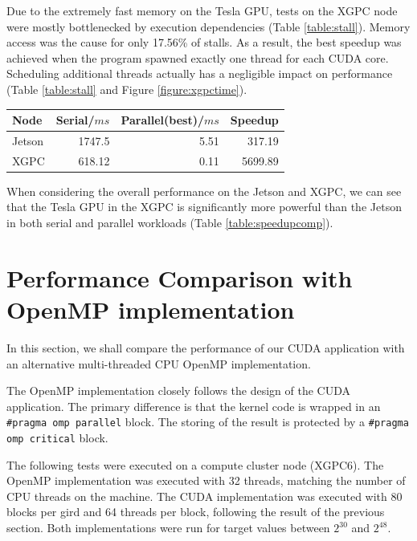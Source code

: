 \documentclass[a4paper,12pt]{article}
\begin{document}
Due to the extremely fast memory on the Tesla GPU, tests on the XGPC node were mostly bottlenecked by execution dependencies (Table \ref{table:stall}). Memory access was the cause for only 17.56\% of stalls. As a result, the best speedup was achieved when the program spawned exactly one thread for each CUDA core. Scheduling additional threads actually has a negligible impact on performance (Table \ref{table:stall} and Figure \ref{figure:xgpctime}).

\begin{center}
  \begin{tabular}{l | r r r}
    Node & Serial/$ms$ & Parallel(best)/$ms$ &	Speedup \\ \hline
    Jetson & 1747.5 & 5.51 & 317.19 \\
    XGPC & 618.12 & 0.11 & 5699.89 \\
  \end{tabular}
  \label{table:speedupcomp}
\end{center}

When considering the overall performance on the Jetson and XGPC, we can see that the Tesla GPU in the XGPC is significantly more powerful than the Jetson in both serial and parallel workloads (Table \ref{table:speedupcomp}).

\section{Performance Comparison with OpenMP implementation}

In this section, we shall compare the performance of our CUDA application with an alternative multi-threaded CPU OpenMP implementation.

The OpenMP implementation closely follows the design of the CUDA application. The primary difference is that the kernel code is wrapped in an \texttt{#pragma omp parallel} block. The storing of the result is protected by a \texttt{#pragma omp critical} block.

The following tests were executed on a compute cluster node (XGPC6). The OpenMP implementation was executed with 32 threads, matching the number of CPU threads on the machine. The CUDA implementation was executed with 80 blocks per gird and 64 threads per block, following the result of the previous section. Both implementations were run for target values between $2^{30}$ and $2^{48}$.
\end{document}
